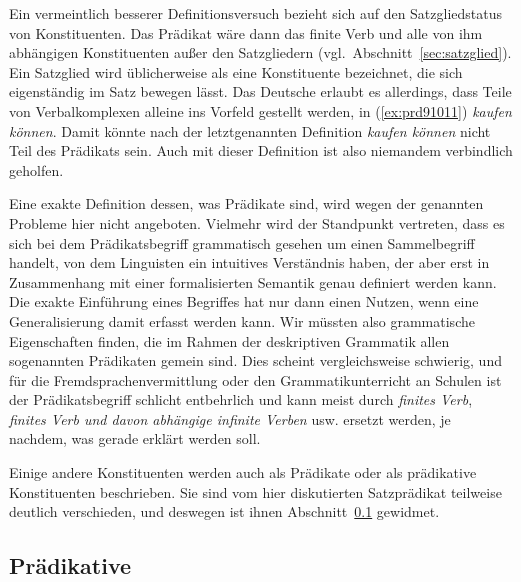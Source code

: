 
\label{abs:satzgliedfail}Ein vermeintlich besserer Definitionsversuch bezieht sich auf den Satzgliedstatus von Konstituenten.
Das Prädikat wäre dann das finite Verb und alle von ihm abhängigen Konstituenten außer den Satzgliedern (vgl.\ Abschnitt~\ref{sec:satzglied}).
Ein Satzglied wird üblicherweise als eine Konstituente bezeichnet, die sich eigenständig im Satz bewegen lässt.
Das Deutsche erlaubt es allerdings, dass Teile von Verbalkomplexen alleine ins Vorfeld gestellt werden, in (\ref{ex:prd91011}) \zB \textit{kaufen können}.
Damit könnte nach der letztgenannten Definition \textit{kaufen können} nicht Teil des Prädikats sein.
Auch mit dieser Definition ist also niemandem verbindlich geholfen.

\begin{exe}
\end{exe}

Eine exakte Definition dessen, was Prädikate sind, wird wegen der genannten Probleme hier nicht angeboten.
Vielmehr wird der Standpunkt vertreten, dass es sich bei dem Prädikatsbegriff grammatisch gesehen um einen Sammelbegriff handelt, von dem Linguisten ein intuitives Verständnis haben, der aber erst in Zusammenhang mit einer formalisierten Semantik genau definiert werden kann.
Die exakte Einführung eines Begriffes hat nur dann einen Nutzen, wenn eine Generalisierung damit erfasst werden kann.
Wir müssten also grammatische Eigenschaften finden, die im Rahmen der deskriptiven Grammatik allen sogenannten Prädikaten gemein sind.
Dies scheint vergleichsweise schwierig, und für die Fremdsprachenvermittlung oder den Grammatikunterricht an Schulen ist der Prädikatsbegriff schlicht entbehrlich und kann meist durch \textit{finites Verb}, \textit{finites Verb und davon abhängige infinite Verben} usw. ersetzt werden, je nachdem, was gerade erklärt werden soll.

Einige andere Konstituenten werden auch als Prädikate oder als prädikative Konstituenten beschrieben.
Sie sind vom hier diskutierten Satzprädikat teilweise deutlich verschieden, und deswegen ist ihnen Abschnitt~\ref{sec:praedikative} gewidmet.

\subsection{Prädikative}

\label{sec:praedikative}

